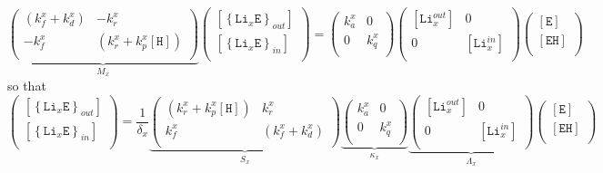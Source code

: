 \documentclass[aps,onecolumn,11pt]{revtex4}
\newcommand{\mychem}[1]{\mathtt{#1}}
\newcommand{\myconc}[1]{\left\lbrack{#1}\right\rbrack}
\newcommand{\LiEin}[1]{\myconc{\left\lbrace\mychem{Li}_{#1}\mychem{E}\right\rbrace_{in}}}
\newcommand{\LiEout}[1]{\myconc{\left\lbrace\mychem{Li}_{#1}\mychem{E}\right\rbrace_{out}}}
\newcommand{\LiIn}[1]{\myconc{\mychem{Li}_{#1}^{in}}}
\newcommand{\LiOut}[1]{\myconc{\mychem{Li}_{#1}^{out}}}
\newcommand{\EHin}{\myconc{\mychem{EH}}}
\newcommand{\Eout}{\myconc{\mychem{E}}}
\newcommand{\Hin}{\myconc{\mychem{H}}}
\begin{document}
\begin{equation}
\underbrace{
\begin{pmatrix}
	\left(k_f^x+k_d^x\right) & -k_r^x\\
	-k_f^x & \left(k_r^x+k_p^x\Hin\right)\\
\end{pmatrix}
}_{M_x}
\begin{pmatrix}
	\LiEout{x}\\
	\LiEin{x}\\
\end{pmatrix}
=
	\begin{pmatrix}
	k_a^x & 0 \\
	0     & k_q^x \\
	\end{pmatrix}
	\begin{pmatrix}
	\LiOut{x} & 0 \\
	0     & \LiIn{x} \\
	\end{pmatrix}
	\begin{pmatrix}
	\Eout\\
	\EHin\\
	\end{pmatrix}
\end{equation}
so that
\begin{equation}
	\begin{pmatrix}
	\LiEout{x}\\
	\LiEin{x}\\
\end{pmatrix}
= \dfrac{1}{\delta_x} 
\underbrace{
\begin{pmatrix}
	\left(k_r^x+k_p^x\Hin\right) & k_r^x\\
	k_f^x & \left(k_f^x+k_d^x\right)\\
\end{pmatrix}}_{S_x}
\underbrace{
\begin{pmatrix}
	k_a^x & 0 \\
	0     & k_q^x \\
	\end{pmatrix}
		}_{\kappa_x}
\underbrace{
	\begin{pmatrix}
	\LiOut{x} & 0 \\
	0     & \LiIn{x} \\
	\end{pmatrix}
}_{\Lambda_x}
	\begin{pmatrix}
	\Eout\\
	\EHin\\
	\end{pmatrix}
\end{equation}
\end{document}
